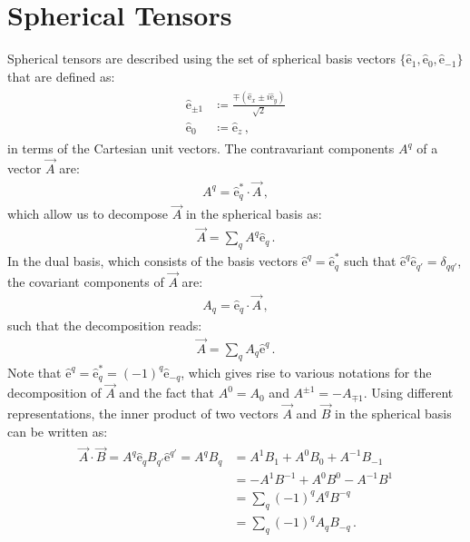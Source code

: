 \documentclass[../Thesis-IJspeert.tex]{subfiles}
\begin{document}
\chapter{Spherical Tensors}
\label{sphericaltensors}
Spherical tensors are described using the set of spherical basis vectors $\{\hat{\mathrm{e}}_1, \hat{\mathrm{e}}_0, \hat{\mathrm{e}}_{-1}\}$ that are defined as:
\begin{align}
\begin{split}
\hat{\mathrm{e}}_{\pm 1} &\coloneqq \frac{\mp(\hat{\mathrm{e}}_x\pm i \hat{\mathrm{e}}_y)}{\sqrt{2}}\\ \hat{\mathrm{e}}_0&\coloneqq\hat{\mathrm{e}}_z\,,
\end{split}
\end{align}
in terms of the Cartesian unit vectors. The contravariant components $A^q$ of a vector $\vec{A}$ are:
\begin{align}
A^q=\hat{\mathrm{e}}_q^*\cdot \vec{A}\,,
\end{align}
which allow us to decompose $\vec{A}$ in the spherical basis as:
\begin{align}
\vec{A}=\sum_q A^q \hat{\mathrm{e}}_q\,.
\end{align}
In the dual basis, which consists of the basis vectors $\hat{\mathrm{e}}^q=\hat{\mathrm{e}}_q^*$ such that $\hat{\mathrm{e}}^q\hat{\mathrm{e}}_{q'}=\delta_{qq'}$, the covariant components of $\vec{A}$ are:
\begin{align}
A_q = \hat{\mathrm{e}}_q\cdot \vec{A}\,,
\end{align} 
such that the decomposition reads:
\begin{align}
\vec{A}=\sum_q A_q \hat{\mathrm{e}}^q\,.
\end{align}
Note that $\hat{\mathrm{e}}^q=\hat{\mathrm{e}}_q^*=(-1)^q\hat{\mathrm{e}}_{-q}$, which gives rise to various notations for the decomposition of $\vec{A}$ and the fact that $A^0=A_0$ and $A^{\pm 1}= -A_{\mp 1}$. Using different representations, the inner product of two vectors $\vec{A}$ and $\vec{B}$ in the spherical basis can be written as:
\begin{align}
\begin{split}
\vec{A}\cdot\vec{B}= A^q \hat{\mathrm{e}}_q B_{q'} \hat{\mathrm{e}}^{q'} = A^q B_q &= A^1 B_1 + A^0 B_0 + A^{-1} B_{-1} \\&= -A^1 B^{-1} + A^0 B^0 - A^{-1} B^1 \\&= \sum_q (-1)^q A^q B^{-q} \\&= \sum_q (-1)^q A_q B_{-q}\,.
\end{split}
\end{align}
\end{document}
